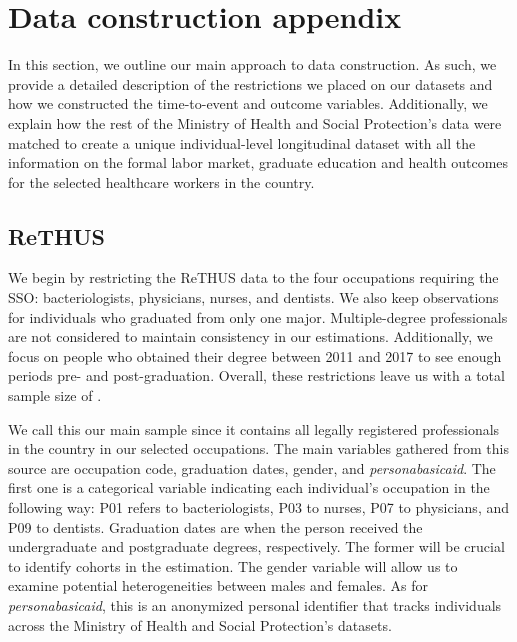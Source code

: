 \documentclass[12pt, a4paper]{article}
\begin{document}
\newpage



\newpage
\appendix
{}

\section{Data construction appendix \label{sec:data_appendix}}

In this section, we outline our main approach to data construction. As such, we provide a detailed description of the restrictions we placed on our datasets and how we constructed the time-to-event and outcome variables. Additionally, we explain how the rest of the Ministry of Health and Social Protection's data were matched to create a unique individual-level longitudinal dataset with all the information on the formal labor market, graduate education and health outcomes for the selected healthcare workers in the country.


\subsection{ReTHUS}

We begin by restricting the ReTHUS data to the four occupations requiring the SSO: bacteriologists, physicians, nurses, and dentists. We also keep observations for individuals who graduated from only one major. Multiple-degree professionals are not considered to maintain consistency in our estimations. Additionally, we focus on people who obtained their degree between 2011 and 2017 to see enough periods pre- and post-graduation. Overall, these restrictions leave us with a total sample size of \samplerethus.

We call this our main sample since it contains all legally registered professionals in the country in our selected occupations. The main variables gathered from this source are occupation code, graduation dates, gender, and \textit{personabasicaid}. The first one is a categorical variable indicating each individual's occupation in the following way: P01 refers to bacteriologists, P03 to nurses, P07 to physicians, and P09 to dentists. Graduation dates are when the person received the undergraduate and postgraduate degrees, respectively. The former will be crucial to identify cohorts in the \citet{callaway2021difference} estimation. The gender variable will allow us to examine potential heterogeneities between males and females. As for \textit{personabasicaid}, this is an anonymized personal identifier that tracks individuals across the Ministry of Health and Social Protection's datasets.
\end{document}
